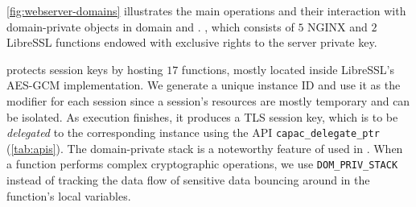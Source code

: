 \autoref{fig:webserver-domains} illustrates the main operations and their interaction with domain-private objects in domain \domhs and \domses.
\domhs, which consists of $5$ NGINX and $2$ LibreSSL functions endowed with exclusive rights to the server private key.


\domses protects session keys by hosting $17$ functions,  mostly located inside LibreSSL's AES-GCM implementation.
We generate a unique instance ID and use it as the modifier for each session since a session's resources are mostly temporary and can be isolated. 
As \domhs execution finishes, it produces a TLS session key, which is to be \emph{delegated} to the corresponding \domses instance using the API \texttt{capac\_delegate\_ptr} (\autoref{tab:apis}).
The domain-private stack  is a noteworthy feature of \thename used in \domses.
When a function performs complex cryptographic operations, we use \texttt{DOM\_PRIV\_STACK} instead of tracking the data flow of sensitive data bouncing around in the function's local variables.



